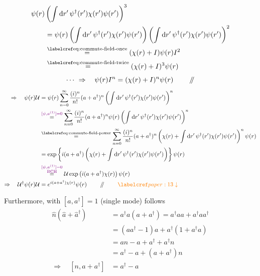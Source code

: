 \begin{align*}
&\psi(r)\left(\int \dint r'\,\psi^\dagger(r')\chi(r')\psi(r')\right)^3\\
&\qquad=\psi(r)
  \left(\int \dint r'\,\psi^\dagger(r')\chi(r')\psi(r')\right)
  \left(\int \dint r'\,\psi^\dagger(r')\chi(r')\psi(r')\right)^2\\
&\qquad\stepref{eq:commute-field-once}(\chi(r)+I)\psi(r)I^2\\
&\qquad\stepref{eq:commute-field-twice}(\chi(r)+I)^3\psi(r)
\end{align*}
\begin{equation}
\cdots\ \Rightarrow\quad\psi(r)I^n=(\chi(r)+I)^n\psi(r)
\qquad \done
\label{eq:commute-field-power}
\end{equation}
\begin{align*}
\Rightarrow\quad\psi(r)\mathcal U
  &=\psi(r)\sum_{n=0}^{\infty}\frac{(i)^n}{n!}(a+a^\dagger)^n
     \left(\int \dint r'\,\psi^\dagger(r')\chi(r')\psi(r')\right)^n\\
  &\overset{\annotation{[\psi,a^{(\dagger)}]=0}}{=}
     \sum_{n=0}^{\infty}\frac{(i)^n}{n!}(a+a^\dagger)^n\psi(r)
     \left(\int \dint r'\,\psi^\dagger(r')\chi(r')\psi(r')\right)^n\\
  &\stepref{eq:commute-field-power}
     \sum_{n=0}^{\infty}\frac{(i)^n}{n!}(a+a^\dagger)^n
     \left(\chi(r)+\int \dint r'\,\psi^\dagger(r')\chi(r')\psi(r')\right)^n
        \psi(r)\\
  &=\exp\left\{i(a+a^\dagger)
       \left(\chi(r)+\int \dint r'\,\psi^\dagger(r')\chi(r')\psi(r')\right)
     \right\}\psi(r)\\
  &\overset{\annotation{\substack{[\psi,a^{(\dagger)}]=0\\\text{BCH}}}}{=}
       \mathcal U\exp\left(i(a+a^\dagger)\chi(r)\right)\psi(r)\\
\Rightarrow\quad\mathcal U^\dagger\psi(r)\mathcal U
  &=e^{i(a+a^\dagger)\chi(r)}\psi(r)\qquad\done
     \qquad\paperref{paper:13}\;\textcolor{orange}{\downarrow}
\end{align*}

 Furthermore, with \([a,a^\dagger]=1\) (single mode) follows
\begin{align*}
\hat n(\hat a+\hat a^\dagger)
  &=a^\dagger a(a+a^\dagger)=a^\dagger aa+a^\dagger aa^\dagger\\
  &=(aa^\dagger-1)a+a^\dagger(1+a^\dagger a)\\
  &=an-a+a^\dagger+a^\dagger n\\
  &=a^\dagger-a+(a+a^\dagger)n\\
\Rightarrow\quad[n,a+a^\dagger]&=a^\dagger-a
\end{align*}

